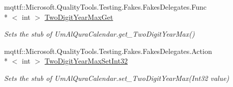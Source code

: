 \begin{DoxyCompactItemize}
mqttf\-::\-Microsoft.\-Quality\-Tools.\-Testing.\-Fakes.\-Fakes\-Delegates.\-Func\\*
$<$ int $>$ \hyperlink{class_system_1_1_globalization_1_1_fakes_1_1_stub_um_al_qura_calendar_a8c2a76e43da2f85000b01e7f3f8b91a9}{Two\-Digit\-Year\-Max\-Get}
\begin{DoxyCompactList}\small\item\em Sets the stub of Um\-Al\-Qura\-Calendar.\-get\-\_\-\-Two\-Digit\-Year\-Max()\end{DoxyCompactList}\item 
mqttf\-::\-Microsoft.\-Quality\-Tools.\-Testing.\-Fakes.\-Fakes\-Delegates.\-Action\\*
$<$ int $>$ \hyperlink{class_system_1_1_globalization_1_1_fakes_1_1_stub_um_al_qura_calendar_ace48504b5c287342fa2a67adb45dddef}{Two\-Digit\-Year\-Max\-Set\-Int32}
\begin{DoxyCompactList}\small\item\em Sets the stub of Um\-Al\-Qura\-Calendar.\-set\-\_\-\-Two\-Digit\-Year\-Max(\-Int32 value)\end{DoxyCompactList}\end{DoxyCompactItemize}
